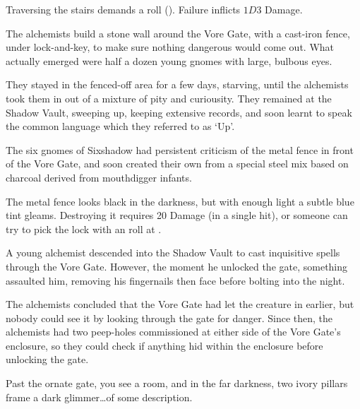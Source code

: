 \begin{multicols}{2}
Traversing the stairs demands a  roll (\tn[8]).
Failure inflicts $1D3$ Damage.



\begin{exampletext}
  The alchemists build a stone wall around the Vore Gate, with a cast-iron fence, under lock-and-key, to make sure nothing dangerous would come out.
  What actually emerged were half a dozen young gnomes with large, bulbous eyes.

  They stayed in the fenced-off area for a few days, starving, until the alchemists took them in out of a mixture of pity and curiousity.
  They remained at the Shadow Vault, sweeping up, keeping extensive records, and soon learnt to speak the common language which they referred to as `Up'.

  The six gnomes of Sixshadow had persistent criticism of the metal fence in front of the Vore Gate, and soon created their own from a special steel mix based on charcoal derived from mouthdigger infants.
\end{exampletext}

The metal fence looks black in the darkness, but with enough light a subtle blue tint gleams.
Destroying it requires 20 Damage (in a single hit), or someone can try to pick the lock with an  roll at \tn[16].

\shadowVaultMap


\begin{exampletext}
  A young alchemist descended into the Shadow Vault to cast inquisitive spells through the Vore Gate.
  However, the moment he unlocked the gate, something assaulted him, removing his fingernails then face before bolting into the night.

  The alchemists concluded that the Vore Gate had let the creature in earlier, but nobody could see it by looking through the gate for danger.
  Since then, the alchemists had two peep-holes commissioned at either side of the Vore Gate's enclosure, so they could check if anything hid within the enclosure before unlocking the gate.
\end{exampletext}

\begin{boxtext}
  Past the ornate gate, you see a room, and in the far darkness, two ivory pillars frame a dark glimmer\ldots of some description.
\end{boxtext}


\end{multicols}
